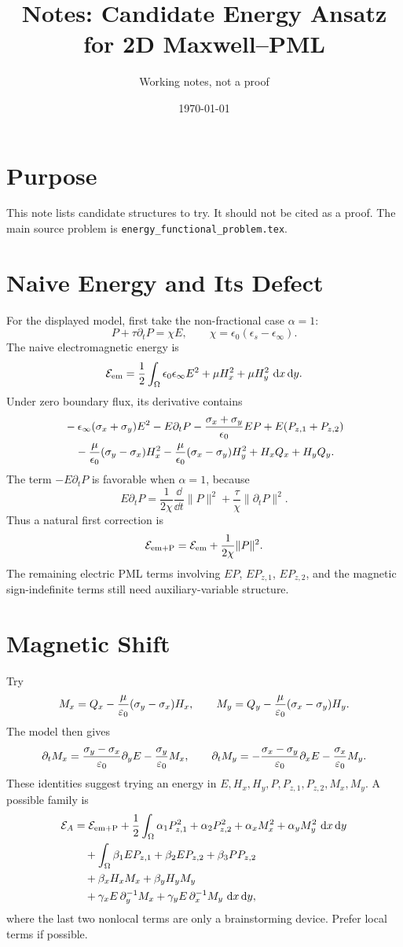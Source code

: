 \documentclass[UTF8,a4paper,12pt]{ctexart}
\title{Notes: Candidate Energy Ansatz for 2D Maxwell--PML}
\author{Working notes, not a proof}
\date{\today}
\begin{document}
\maketitle

\section{Purpose}

This note lists candidate structures to try.  It should not be cited as a proof.  The main source problem is \texttt{energy\_functional\_problem.tex}.

\section{Naive Energy and Its Defect}

For the displayed model, first take the non-fractional case \(\alpha=1\):
\[
  P+\tau\partial_tP=\chi E,\qquad
  \chi=\epsilon_0(\epsilon_s-\epsilon_\infty).
\]
The naive electromagnetic energy is
\[
  \mathcal{E}_{\rm em}
  =\frac12\int_\Omega
  \epsilon_0\epsilon_\infty E^2+\mu H_x^2+\mu H_y^2\,\,\mathrm{d} x\,\mathrm{d} y.
\]
Under zero boundary flux, its derivative contains
\begin{align*}
&-\epsilon_\infty(\sigma_x+\sigma_y)E^2
-E\partial_tP
-\frac{\sigma_x+\sigma_y}{\epsilon_0}EP
+E(P_{z,1}+P_{z,2})\\
&\quad
-\frac{\mu}{\epsilon_0}(\sigma_y-\sigma_x)H_x^2
-\frac{\mu}{\epsilon_0}(\sigma_x-\sigma_y)H_y^2
+H_xQ_x+H_yQ_y.
\end{align*}
The term \(-E\partial_tP\) is favorable when \(\alpha=1\), because
\[
  E\partial_tP
  =\frac{1}{2\chi}\frac{\dd}{\dd t}\|P\|^2
  +\frac{\tau}{\chi}\|\partial_tP\|^2.
\]
Thus a natural first correction is
\[
  \mathcal{E}_{\rm em+P}
  =\mathcal{E}_{\rm em}+\frac{1}{2\chi}\|P\|^2.
\]
The remaining electric PML terms involving \(EP\), \(EP_{z,1}\), \(EP_{z,2}\), and the magnetic sign-indefinite terms still need auxiliary-variable structure.

\section{Magnetic Shift}

Try
\[
  M_x=Q_x-\frac{\mu}{\varepsilon_0}(\sigma_y-\sigma_x)H_x,\qquad
  M_y=Q_y-\frac{\mu}{\varepsilon_0}(\sigma_x-\sigma_y)H_y.
\]
The model then gives
\[
  \partial_tM_x=\frac{\sigma_y-\sigma_x}{\varepsilon_0}\partial_yE-\frac{\sigma_y}{\varepsilon_0}M_x,
\qquad
  \partial_tM_y=-\frac{\sigma_x-\sigma_y}{\varepsilon_0}\partial_xE-\frac{\sigma_x}{\varepsilon_0}M_y.
\]
These identities suggest trying an energy in \(E,H_x,H_y,P,P_{z,1},P_{z,2},M_x,M_y\).  A possible family is
\[
\begin{aligned}
\mathcal{E}_A
&=\mathcal{E}_{\rm em+P}
 +\frac12\int_\Omega
 \alpha_1 P_{z,1}^2+\alpha_2 P_{z,2}^2
 +\alpha_xM_x^2+\alpha_yM_y^2\,\,\mathrm{d} x\,\mathrm{d} y\\
&\quad
 +\int_\Omega
 \beta_1EP_{z,1}+\beta_2EP_{z,2}+\beta_3PP_{z,2}\\
&\quad
 +\beta_xH_xM_x+\beta_yH_yM_y\\
&\quad
 +\gamma_xE\,\partial_y^{-1}M_x
 +\gamma_yE\,\partial_x^{-1}M_y
 \,\,\mathrm{d} x\,\mathrm{d} y,
\end{aligned}
\]
where the last two nonlocal terms are only a brainstorming device.  Prefer local terms if possible.
\end{document}
